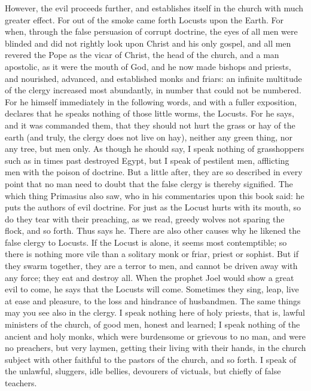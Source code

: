 However, the evil proceeds further, and establishes itself in the church with much greater effect. For out of the smoke came forth Locusts upon the Earth. For when, through the false persuasion of corrupt doctrine, the eyes of all men were blinded and did not rightly look upon Christ and his only gospel, and all men revered the Pope as the vicar of Christ, the head of the church, and a man apostolic, as it were the mouth of God, and he now made bishops and priests, and nourished, advanced, and established monks and friars: an infinite multitude of the clergy increased most abundantly, in number that could not be numbered. For he himself immediately in the following words, and with a fuller exposition, declares that he speaks nothing of those little worms, the Locusts. For he says, and it was commanded them, that they should not hurt the grass or hay of the earth (and truly, the clergy does not live on hay), neither any green thing, nor any tree, but men only. As though he should say, I speak nothing of grasshoppers such as in times past destroyed Egypt, but I speak of pestilent men, afflicting men with the poison of doctrine. But a little after, they are so described in every point that no man need to doubt that the false clergy is thereby signified. The which thing Primasius also saw, who in his commentaries upon this book said: he puts the authors of evil doctrine. For just as the Locust hurts with its mouth, so do they tear with their preaching, as we read, greedy wolves not sparing the flock, and so forth. Thus says he. There are also other causes why he likened the false clergy to Locusts. If the Locust is alone, it seems most contemptible; so there is nothing more vile than a solitary monk or friar, priest or sophist. But if they swarm together, they are a terror to men, and cannot be driven away with any force; they eat and destroy all. When the prophet Joel would show a great evil to come, he says that the Locusts will come. Sometimes they sing, leap, live at ease and pleasure, to the loss and hindrance of husbandmen. The same things may you see also in the clergy. I speak nothing here of holy priests, that is, lawful ministers of the church, of good men, honest and learned; I speak nothing of the ancient and holy monks, which were burdensome or grievous to no man, and were no preachers, but very laymen, getting their living with their hands, in the church subject with other faithful to the pastors of the church, and so forth. I speak of the unlawful, sluggers, idle bellies, devourers of victuals, but chiefly of false teachers.

